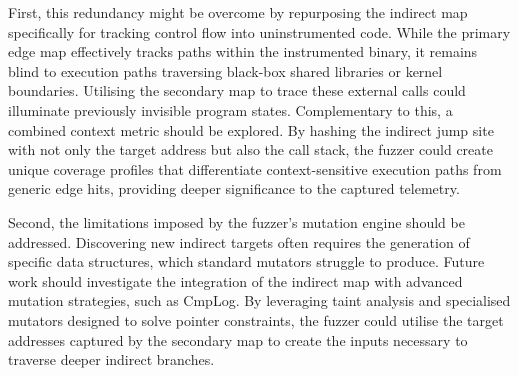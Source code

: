 First, this redundancy might be overcome by repurposing the indirect map specifically for tracking control flow into uninstrumented code. While the primary edge map effectively tracks paths within the instrumented binary, it remains blind to execution paths traversing black-box shared libraries or kernel boundaries. Utilising the secondary map to trace these external calls could illuminate previously invisible program states. Complementary to this, a combined context metric should be explored. By hashing the indirect jump site with not only the target address but also the call stack, the fuzzer could create unique coverage profiles that differentiate context-sensitive execution paths from generic edge hits, providing deeper significance to the captured telemetry.

Second, the limitations imposed by the fuzzer's mutation engine should be addressed. Discovering new indirect targets often requires the generation of specific data structures, which standard mutators struggle to produce. Future work should investigate the integration of the indirect map with advanced mutation strategies, such as CmpLog. By leveraging taint analysis and specialised mutators designed to solve pointer constraints, the fuzzer could utilise the target addresses captured by the secondary map to create the inputs necessary to traverse deeper indirect branches.
